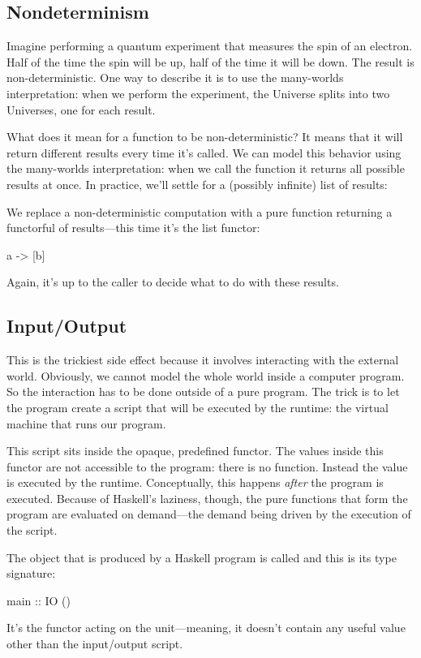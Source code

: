 \documentclass[DaoFP]{subfiles}
\begin{document}
\subsection{Nondeterminism}

Imagine performing a quantum experiment that measures the spin of an electron. Half of the time the spin will be up, half of the time it will be down. The result is non-deterministic. One way to describe it is to use the many-worlds interpretation: when we perform the experiment, the Universe splits into two Universes, one for each result.  

What does it mean for a function to be non-deterministic? It means that it will return different results every time it's called. We can model this behavior using the many-worlds interpretation: when we call the function it returns all possible results at once. In practice, we'll settle for a (possibly infinite) list of results:

We replace a non-deterministic computation  with a pure function returning a functorful of results---this time it's the list functor:
\begin{haskell}
a -> [b]
\end{haskell}
Again, it's up to the caller to decide what to do with these results.

\subsection{Input/Output}

This is the trickiest side effect because it involves interacting with the external world. Obviously, we cannot model the whole world inside a computer program. So the interaction has to be done outside of a pure program. The trick is to let the program create a script that will be executed by the runtime: the virtual machine that runs our program. 

This script sits inside the opaque, predefined  functor. The values inside this functor are not accessible to the program: there is no  function. Instead the  value is executed by the runtime. Conceptually, this happens \emph{after} the program is executed. Because of Haskell's laziness, though, the pure functions that form the program are evaluated on demand---the demand being driven by the execution of the  script.

The  object that is produced by a Haskell program is called  and this is its type signature:
\begin{haskell}
main :: IO ()
\end{haskell}
It's the  functor acting on the unit---meaning, it doesn't contain any useful value other than the input/output script.
\end{document}
